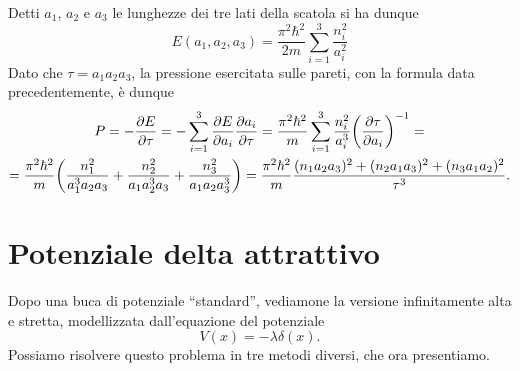 Detti $a_1$, $a_2$ e $a_3$ le lunghezze dei tre lati della scatola si ha dunque
\begin{equation}
	E(a_1,a_2,a_3)=\frac{\pi^2\hbar^2}{2m}\sum_{i=1}^3\frac{n_i^2}{a_i^2}
\end{equation}
Dato che $\tau=a_1a_2a_3$, la pressione esercitata sulle pareti, con la formula data precedentemente, è dunque
\begin{multline}
	P=-\frac{\partial {E}}{\partial {\tau}}=-\sum_{i=1}^3\frac{\partial {E}}{\partial {a_i}}\frac{\partial {a_i}}{\partial {\tau}}=
	\frac{\pi^2\hbar^2}{m}\sum_{i=1}^3\frac{n_i^2}{a_i^3}\bigg(\frac{\partial {\tau}}{\partial {a_i}}\bigg)^{-1}=\\=
	\frac{\pi^2\hbar^2}{m}\bigg(\frac{n_1^2}{a_1^3a_2a_3}+\frac{n_2^2}{a_1a_2^3a_3}+\frac{n_3^2}{a_1a_2a_3^3}\bigg)=
	\frac{\pi^2\hbar^2}{m}\frac{(n_1a_2a_3)^2+(n_2a_1a_3)^2+(n_3a_1a_2)^2}{\tau^3}.
\end{multline}

\section{Potenziale delta attrattivo}
Dopo una buca di potenziale ``standard'', vediamone la versione infinitamente alta e stretta, modellizzata dall'equazione del potenziale
\begin{equation}
	V(x)=-\lambda\delta(x).
	\label{eq:potenziale-delta-attrattivo}
\end{equation}
Possiamo risolvere questo problema in tre metodi diversi, che ora presentiamo.
